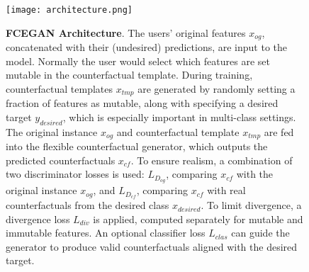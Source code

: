 \begin{figure}[t!]
    \centering
    \texttt{[image: architecture.png]}
    \caption{\textbf{FCEGAN Architecture}. The users' original features \(x_{og}\), concatenated with their (undesired) predictions, are input to the model. Normally the user would select which features are set mutable in the counterfactual template. During training, counterfactual templates \( x_{tmp} \) are generated by randomly setting a fraction of features as mutable, along with specifying a desired target \( y_{desired} \), which is especially important in multi-class settings. The original instance \( x_{og} \) and counterfactual template \( x_{tmp} \) are fed into the flexible counterfactual generator, which outputs the predicted counterfactuals \( x_{cf} \). To ensure realism, a combination of two discriminator losses is used: \( L_{D_{og}} \), comparing \( x_{cf} \) with the original instance \( x_{og} \), and \( L_{D_{cf}} \), comparing \( x_{cf} \) with real counterfactuals from the desired class \( x_{desired} \). To limit divergence, a divergence loss \( L_{div} \) is applied, computed separately for mutable and immutable features. An optional classifier loss \( L_{clas} \) can guide the generator to produce valid counterfactuals aligned with the desired target.}
    \label{fig:architecture}
\end{figure}